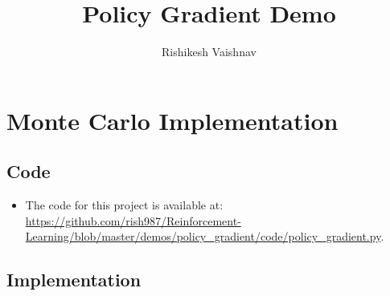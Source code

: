 \documentclass[a4paper]{article}
\title{Policy Gradient Demo}
\author{Rishikesh Vaishnav}
\begin{document}
\maketitle
\section*{Monte Carlo Implementation}
\subsection*{Code}
\begin{itemize}
    \item The code for this project is available at: 
\url{https://github.com/rish987/Reinforcement-Learning/blob/master/demos/policy_gradient/code/policy_gradient.py}.
\end{itemize}
\subsection*{Implementation}
\begin{centering}
    \scalebox{0.6}{} \\
\end{centering}
\end{document}
